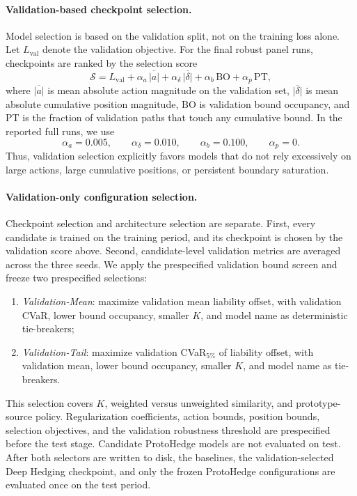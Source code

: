 \documentclass[sigconf]{acmart}
\begin{document}
\paragraph{Validation-based checkpoint selection.}
Model selection is based on the validation split, not on the training loss alone. Let $L_{\mathrm{val}}$ denote the validation objective. For the final robust panel runs, checkpoints are ranked by the selection score
\[
\mathcal{S}
=
L_{\mathrm{val}}
+
\alpha_a \,\overline{|a|}
+
\alpha_\delta \,\overline{|\delta|}
+
\alpha_b \,\mathrm{BO}
+
\alpha_p \,\mathrm{PT},
\]
where $\overline{|a|}$ is mean absolute action magnitude on the validation set, $\overline{|\delta|}$ is mean absolute cumulative position magnitude, $\mathrm{BO}$ is validation bound occupancy, and $\mathrm{PT}$ is the fraction of validation paths that touch any cumulative bound. In the reported full runs, we use
\[
\alpha_a = 0.005,\qquad
\alpha_\delta = 0.010,\qquad
\alpha_b = 0.100,\qquad
\alpha_p = 0.
\]
Thus, validation selection explicitly favors models that do not rely excessively on large actions, large cumulative positions, or persistent boundary saturation.

\paragraph{Validation-only configuration selection.}
Checkpoint selection and architecture selection are separate. First, every
candidate is trained on the training period, and its checkpoint is chosen by
the validation score above. Second, candidate-level validation metrics are
averaged across the three seeds. We apply the prespecified validation bound
screen and freeze two prespecified selections:
\begin{enumerate}
    \item \emph{Validation-Mean}: maximize validation mean liability offset,
    with validation CVaR, lower bound occupancy, smaller $K$, and model name as
    deterministic tie-breakers;
    \item \emph{Validation-Tail}: maximize validation
    CVaR$_{5\%}$ of liability offset, with validation mean, lower bound
    occupancy, smaller $K$, and model name as tie-breakers.
\end{enumerate}
This selection covers $K$, weighted versus unweighted similarity, and
prototype-source policy. Regularization coefficients, action bounds, position
bounds, selection objectives, and the validation robustness threshold are
prespecified before the test stage. Candidate ProtoHedge models are not
evaluated on test. After both selectors are written to disk, the baselines,
the validation-selected Deep Hedging checkpoint, and only the frozen
ProtoHedge configurations are evaluated once on the test period.
\end{document}
